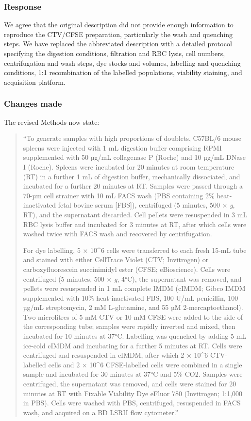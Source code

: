 \documentclass[
  11pt,
  a4paper,
]{article}
\begin{document}
\subsubsection{Response}\label{response-11}

We agree that the original description did not provide enough
information to reproduce the CTV/CFSE preparation, particularly the wash
and quenching steps. We have replaced the abbreviated description with a
detailed protocol specifying the digestion conditions, filtration and
RBC lysis, cell numbers, centrifugation and wash steps, dye stocks and
volumes, labelling and quenching conditions, 1:1 recombination of the
labelled populations, viability staining, and acquisition platform.

\subsubsection{Changes made}\label{changes-made-11}

The revised Methods now state:

\begin{quote}
``To generate samples with high proportions of doublets, C57BL/6 mouse
spleens were injected with 1 mL digestion buffer comprising RPMI
supplemented with 50 µg/mL collagenase P (Roche) and 10 µg/mL DNase I
(Roche). Spleens were incubated for 20 minutes at room temperature (RT)
in a further 1 mL of digestion buffer, mechanically dissociated, and
incubated for a further 20 minutes at RT. Samples were passed through a
70-µm cell strainer with 10 mL FACS wash (PBS containing 2\%
heat-inactivated fetal bovine serum {[}FBS{]}), centrifuged (5 minutes,
500 × \emph{g}, RT), and the supernatant discarded. Cell pellets were
resuspended in 3 mL RBC lysis buffer and incubated for 3 minutes at RT,
after which cells were washed twice with FACS wash and recovered by
centrifugation.

For dye labelling, 5 × 10\^{}6 cells were transferred to each fresh
15-mL tube and stained with either CellTrace Violet (CTV; Invitrogen) or
carboxyfluorescein succinimidyl ester (CFSE; eBioscience). Cells were
centrifuged (5 minutes, 500 × \emph{g}, 4°C), the supernatant was
removed, and pellets were resuspended in 1 mL complete IMDM (cIMDM;
Gibco IMDM supplemented with 10\% heat-inactivated FBS, 100 U/mL
penicillin, 100 µg/mL streptomycin, 2 mM L-glutamine, and 55 µM
2-mercaptoethanol). Two microlitres of 5 mM CTV or 10 mM CFSE were added
to the side of the corresponding tube; samples were rapidly inverted and
mixed, then incubated for 10 minutes at 37°C. Labelling was quenched by
adding 5 mL ice-cold cIMDM and incubating for a further 5 minutes at RT.
Cells were centrifuged and resuspended in cIMDM, after which 2 × 10\^{}6
CTV-labelled cells and 2 × 10\^{}6 CFSE-labelled cells were combined in
a single sample and incubated for 30 minutes at 37°C and 5\% CO2.
Samples were centrifuged, the supernatant was removed, and cells were
stained for 20 minutes at RT with Fixable Viability Dye eFluor 780
(Invitrogen; 1:1,000 in PBS). Cells were washed with PBS, centrifuged,
resuspended in FACS wash, and acquired on a BD LSRII flow cytometer.''
\end{quote}
\end{document}
